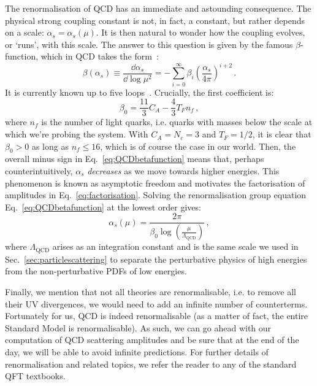\documentclass[main.tex]{subfiles}
\begin{document}
The renormalisation of QCD has an immediate and astounding consequence. The physical strong coupling constant is not, in fact, a constant, but rather depends on a scale: $\alpha_s = \alpha_s(\mu)$. 
It is then natural to wonder how the coupling evolves, or `runs', with this scale. The answer to this question is given by the famous $\beta$-function, which in QCD takes the form~\cite{PhysRevD.2.1541, Symanzik:1970rt}:
\begin{equation} \label{eq:QCDbetafunction}
    \beta(\alpha_s) \equiv \frac{\dd \alpha_s}{\dd \log \mu^2} = - \sum_{i=0}^\infty \beta_i \left (\frac{\alpha_s}{4\pi} \right)^{i+2}\,.
\end{equation}
It is currently known up to five loops~\cite{Baikov:2016tgj}. Crucially, the first coefficient is:
\begin{equation}
    \beta_0 = \frac{11}{3} C_A - \frac{4}{3} T_F n_f\,,
\end{equation}
where $n_f$ is the number of light quarks, i.e. quarks with masses below the scale at which we're probing the system. With $C_A = N_c = 3$ and $T_F = 1/2$, it is clear that $\beta_0>0$ as long as $n_f\le 16$, which is of course the case in our world. Then, the overall minus sign in Eq.~\ref{eq:QCDbetafunction} means that, perhaps counterintuitively, $\alpha_s$ \textit{decreases} as we move towards higher energies. This phenomenon is known as asymptotic freedom and motivates the factorisation of amplitudes in Eq.~\ref{eq:factorisation}. Solving the renormalisation group equation Eq.~\ref{eq:QCDbetafunction} at the lowest order gives:
\begin{equation}
    \alpha_s(\mu) = \frac{2\pi}{\beta_0 \log \left(\frac{\mu}{\Lambda_\text{QCD}}\right)}\,,
\end{equation}
where $\Lambda_\text{QCD}$ arises as an integration constant and is the same scale we used in Sec.~\ref{sec:particlescattering} to separate the perturbative physics of high energies from the non-perturbative PDFs of low energies. 

Finally, we mention that not all theories are renormalisable, i.e. to remove all their UV divergences, we would need to add an infinite number of counterterms. Fortunately for us, QCD is indeed renormalisable (as a matter of fact, the entire Standard Model is renormalisable). As such, we can go ahead with our computation of QCD scattering amplitudes and be sure that at the end of the day, we will be able to avoid infinite predictions. For further details of renormalisation and related topics, we refer the reader to any of the standard QFT textbooks.
\end{document}
